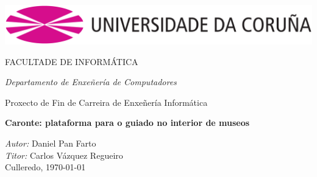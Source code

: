 \begin{titlepage}
\begin{center}

\includegraphics[scale=0.4]{figures/udc}


\Large{FACULTADE DE INFORMÁTICA}

\emph{\large{Departamento de Enxeñería de Computadores}}

Proxecto de Fin de Carreira de Enxeñería Informática

\vspace*{3cm}

\textbf{\LARGE{Caronte: plataforma para o guiado no interior de museos}}

\end{center}

\vspace*{4cm}

\begin{flushright}
\large{
\emph{Autor:} Daniel Pan Farto\\
\emph{Titor: } Carlos Vázquez Regueiro\\
Culleredo, \today}
\end{flushright}

\end{titlepage}
